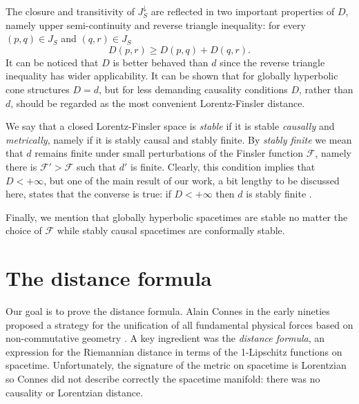 \documentclass[a4paper]{jpconf}
\theoremstyle{definition}
\theoremstyle{remark}
\begin{document}
The closure and transitivity of $J_S^\downarrow$ are reflected in two important properties of $D$, namely upper semi-continuity and  reverse triangle inequality: for every $(p,q)\in J_S$ and $(q,r)\in J_S$
\[
D(p,r)\ge D(p,q)+D(q,r).
\]
It can be noticed that $D$ is better behaved than $d$ since the reverse triangle inequality has wider applicability. It can be shown that for globally hyperbolic cone structures $D=d$, but for less demanding causality conditions $D$, rather than $d$, should be regarded as the most convenient Lorentz-Finsler distance.

We say that a closed Lorentz-Finsler space is {\em stable } if it is stable {\em causally} and {\em metrically}, namely if it is stably causal and stably finite. By {\em stably finite} we mean that $d$ remains finite under small perturbations of the Finsler function $\mathscr{F}$, namely  there is $\mathscr{F}'>\mathscr{F}$ such that $d'$ is finite. Clearly, this condition implies that $D<+\infty$, but one of the main result of our work, a bit  lengthy to be discussed here, states that the converse is true: if $D<+\infty$ then $d$ is stably finite \cite{minguzzi17}.

Finally, we mention that globally hyperbolic spacetimes are stable no matter the choice of $\mathscr{F}$ while stably causal spacetimes are conformally stable.

\section{The distance formula}

Our goal is to prove the distance formula. Alain Connes in the early nineties proposed a strategy for the unification of all fundamental physical forces based on non-commutative geometry \cite{connes94}. A key ingredient was the {\em distance formula}, an expression for the Riemannian distance in terms of the 1-Lipschitz functions on spacetime. Unfortunately, the signature of the metric on spacetime is Lorentzian so Connes did not describe correctly the spacetime manifold: there was no causality or Lorentzian distance.
\end{document}
